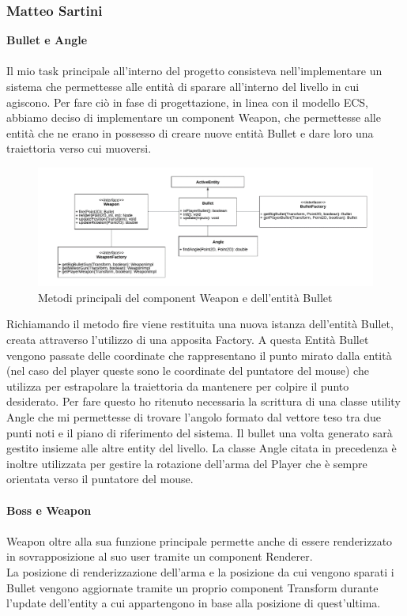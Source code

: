\documentclass{article}
\begin{document}
\subsubsection{Matteo Sartini}
\textbf{Bullet e Angle}\\
\\
Il mio task principale all’interno del progetto consisteva nell’implementare un sistema che permettesse alle entità di sparare all’interno del livello in cui agiscono.
Per fare ciò in fase di progettazione, in linea con il modello ECS, abbiamo deciso di implementare un component Weapon, che permettesse alle entità che ne erano in possesso di creare nuove entità Bullet e dare loro una traiettoria verso cui muoversi.

\begin{figure}[ht]
\includegraphics[width=1\textwidth]{images/UMLWeapon.png}
\caption{Metodi principali del component Weapon e dell’entità Bullet}
\label{fig:weapon}
\end{figure}

Richiamando il metodo fire viene restituita una nuova istanza dell’entità Bullet, creata attraverso l’utilizzo di una apposita Factory. A questa Entità Bullet vengono passate delle coordinate che rappresentano il punto mirato dalla entità (nel caso del player queste sono le coordinate del puntatore del mouse) che utilizza per estrapolare la traiettoria da mantenere per colpire il punto desiderato. Per fare questo ho ritenuto necessaria la scrittura di una classe utility Angle che mi permettesse di trovare l’angolo formato dal vettore teso tra due punti noti e il piano di riferimento del sistema. Il bullet una volta generato sarà gestito insieme alle altre entity del livello.
La classe Angle citata in precedenza è inoltre utilizzata per gestire la rotazione dell’arma del Player che è sempre orientata verso il puntatore del mouse.\\
\\
\textbf{Boss e Weapon}\\
\\
Weapon oltre alla sua funzione principale permette anche di essere renderizzato in sovrapposizione al suo user tramite un component Renderer.\\ La posizione di renderizzazione dell’arma e la posizione da cui vengono sparati i Bullet vengono aggiornate tramite un proprio component Transform durante l’update dell’entity a cui appartengono in base alla posizione di quest’ultima.
\end{document}
